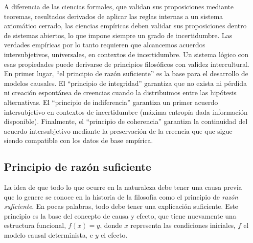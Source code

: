 \documentclass[a4paper,10pt]{book}
\theoremstyle{definition}
\begin{document}
A diferencia de las ciencias formales, que validan sus proposiciones mediante teoremas, resultados derivados de aplicar las reglas internas a un sistema axiomático cerrado, las ciencias empíricas deben validar sus proposiciones dentro de sistemas abiertos, lo que impone siempre un grado de incertidumbre.
%
Las verdades emp\'iricas por lo tanto requieren que alcancemos acuerdos intersubjetivos, universales, en contextos de incertidumbre.
%
Un sistema l\'ogico con esas propiedades puede derivarse de principios filos\'oficos con validez intercultural.
%
En primer lugar, ``el principio de raz\'on suficiente'' es la base para el desarrollo de modelos causales.
%
El ``principio de integridad'' garantiza que no exista ni p\'erdida ni creaci\'on espontánea de creencias cuando la distribuimos entre las hipótesis alternativas.
%
El ``principio de indiferencia'' garantiza un primer acuerdo intersubjetivo en contextos de incertidumbre (máxima entropía dada información disponible).
%
Finalmente, el ``principio de coherencia'' garantiza la continuidad del acuerdo intersubjetivo mediante la preservaci\'on de la creencia que que sigue siendo compatible con los datos de base emp\'irica.

\subsection{Principio de raz\'on suficiente}

La idea de que todo lo que ocurre en la naturaleza debe tener una causa previa que lo genere se conoce en la historia de la filosof\'ia como el principio de \emph{raz\'on suficiente}.
%
En pocas palabras, todo debe tener una explicaci\'on suficiente.
%
Este principio es la base del concepto de causa y efecto, que tiene nuevamente una estructura funcional, $f(x) = y$, donde $x$ representa las condiciones iniciales, $f$ el modelo causal determinista, e $y$ el efecto.

\end{document}
